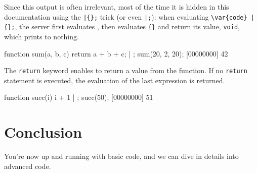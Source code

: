 Since this output is often irrelevant, most of the time it is hidden
in this documentation using the \lstinline'|{};' trick (or even
\lstinline'|;'): when evaluating \lstinline'\var{code} | {};', the
server first evaluates , then evaluates \lstinline'{}' and
return its value, \lstinline'void', which prints to nothing.

\begin{urbiscript}
function sum(a, b, c)
{
  return a + b + c;
} | {};
sum(20, 2, 20);
[00000000] 42
\end{urbiscript}

The \lstinline{return} keyword enables to return a value from the
function. If no \lstinline{return} statement is executed, the
evaluation of the last expression is returned.

\begin{urbiscript}
function succ(i) { i + 1 } | {};
succ(50);
[00000000] 51
\end{urbiscript}

\section{Conclusion}

You're now up and running with basic \us code, and we can dive in
details into advanced \us code.

